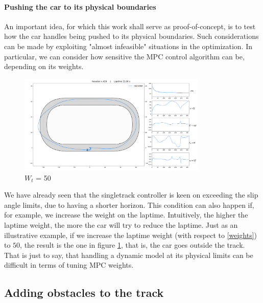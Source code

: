 \documentclass[a4paper, onecolumn, 11pt]{article}
\begin{document}
\paragraph{Pushing the car to its physical boundaries}
An important idea, for which this work shall serve as proof-of-concept, is to
test how the car handles being pushed to its physical boundaries. Such
considerations can be made by exploiting "almost infeasible" situations in the
optimization. In particular, we can consider how sensitive the MPC control
algorithm can be, depending on its weights.  
\begin{figure}[H]
    \centering
    \includegraphics[width=0.8\textwidth]{assets/cascaded_high_laptime_weight.png}
    \caption{$W_{t}$ = 50}
    \label{hightime}
\end{figure}
We have already seen that the singletrack controller is keen on exceeding the
slip angle limits, due to having a shorter horizon. This condition can also
happen if, for example, we increase the weight on the laptime. Intuitively, the
higher the laptime weight, the more the car will try to reduce the laptime. Just
as an illustrative example, if we increase the laptime weight (with respect to
\ref{weights}) to $50$, the result is the one in figure \ref{hightime}, that is,
the car goes outside the track. That is just to say, that handling a dynamic
model at its physical limits can be difficult in terms of tuning MPC weights.

\subsection{Adding obstacles to the track}
\end{document}
